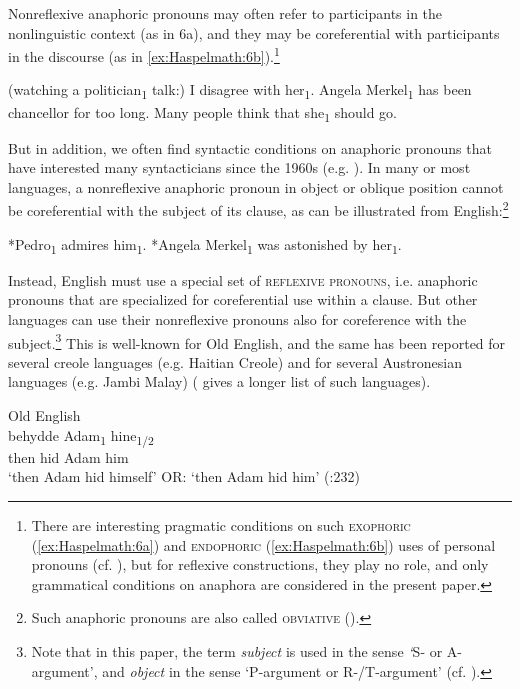 \documentclass[output=paper]{langscibook}
\begin{document}
Nonreflexive anaphoric pronouns may often refer to participants in the nonlinguistic context (as in 6a), and they may be coreferential with participants in the discourse (as in \ref{ex:Haspelmath:6b}).\footnote{{There are interesting pragmatic conditions on such} {\textsc{exophoric}} (\ref{ex:Haspelmath:6a}) and \textsc{endophoric} ({\ref{ex:Haspelmath:6b}) uses of personal pronouns (cf. \citealt{Ariel1990,Ariel2001}), but for reflexive constructions, they play no role, and only grammatical conditions on anaphora are considered in the present paper.}}

\ea \label{ex:Haspelmath:6}
    \ea \label{ex:Haspelmath:6a}
   (watching a politician\textsubscript{1} talk:) {I} {disagree} {with} {her\textsubscript{1}}.
    \ex \label{ex:Haspelmath:6b}
   {Angela} {Merkel\textsubscript{1}} {has} {been} {chancellor} {for} {too} {long.} {Many} {people} {think} {that} {she\textsubscript{1}} {should} {go.}
    \z
\z 

But in addition, we often find syntactic conditions on anaphoric pronouns that have interested many syntacticians since the 1960s (e.g. \citealt{Langacker1969}). In many or most languages, a nonreflexive anaphoric pronoun in object or oblique position cannot be coreferential with the subject of its clause, as can be illustrated from English:\footnote{ {Such anaphoric pronouns are also called} {\textsc{obviative}} {().}}

\ea%
    \label{ex:Haspelmath:7}
   \ea  \label{ex:Haspelmath:7a}
   {*Pedro\textsubscript{1}} {admires} {him\textsubscript{1}}.
   \ex  \label{ex:Haspelmath:7b}
   {*Angela} {Merkel\textsubscript{1}} {was} {astonished} {by} {her\textsubscript{1}}.
\z
\z 

Instead, English must use a special set of \textsc{reflexive} \textsc{pronouns,} i.e. anaphoric pronouns that are specialized for coreferential use within a clause. But other languages can use their nonreflexive pronouns also for coreference with the subject.\footnote{ {Note that in this paper, the term} {\textit{subject}} {is used in the sense} {\textit{‘}}{S- or A-argument’, and} {\textit{object}} {in the sense ‘P-argument or R-/T-argument’ (cf. \citealt{Haspelmath2020}).} } This is well-known for Old English, and the same has been reported for several creole languages (e.g. Haitian Creole) and for several Austronesian languages (e.g. Jambi Malay) (\citealt[222]{Huang2000} gives a longer list of such languages).

\ea Old English\label{ex:Haspelmath:8}\\
    {behydde}  {Adam\textsubscript{1}}  {hine\textsubscript{1/2}}     \\
    then  hid  Adam  him\\
   \glt   ‘then Adam hid himself’ OR: ‘then Adam hid him’  (\citealt{KoenigVezzosi2004}:232)  
\z 
\end{document}

